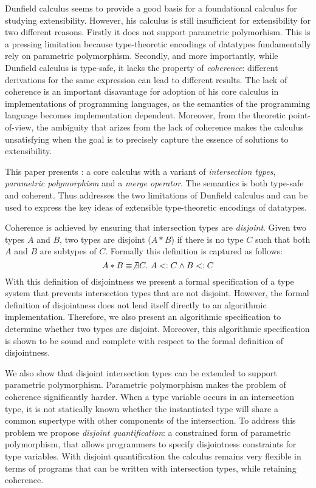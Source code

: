 
Dunfield calculus seems to provide a good basis for a foundational
calculus for studying extensibility.  However, his calculus is still
insufficient for extensibility for two different reasons.  Firstly it does not
support parametric polymorhism. This is a pressing limitation because
type-theoretic encodings of datatypes fundamentally rely on parametric
polymorphism.  Secondly, and more importantly, while Dunfield calculus
is type-safe, it lacks the property of \emph{coherence}: different
derivations for the same expression can lead to different results. The
lack of coherence is an important disavantage for adoption of his core
calculus in implementations of programming languages, as the semantics
of the programming language becomes implementation dependent.
Moreover, from the theoretic point-of-view, the ambiguity that arizes
from the lack of coherence makes the calculus unsatisfying when the
goal is to precisely capture the essence of solutions to
extensibility.

This paper presents \name: a core calculus with a variant of
\emph{intersection types}, \emph{parametric polymorphism} and a
\emph{merge operator}. The semantics \name is both type-safe and
coherent. Thus \name addresses the two limitations of Dunfield
calculus and can be used to express the key ideas of extensible
type-theoretic encodings of datatypes.

Coherence is achieved by ensuring that intersection types are
\emph{disjoint}. Given two types $A$ and $B$, two types are disjoint
($A * B$) if there is no type $C$ such that both $A$ and $B$ are
subtypes of $C$. Formally this definition is captured as follows:
\[A * B \equiv \not\exists C.~A <: C \wedge B <: C\]
With this definition of disjointness we present a formal specification
of a type system that prevents intersection types that are not
disjoint.  However, the formal definition of disjointness does
not lend itself directly to an algorithmic implementation. Therefore,
we also present an algorithmic specification to determine whether two
types are disjoint. Moreover, this algorithmic specification is shown to be
sound and complete with respect to the formal definition of
disjointness.

We also show that disjoint intersection types can be extended to
support parametric polymorphism. Parametric polymorphism makes the
problem of coherence significantly harder. When a type variable occurs
in an intersection type, it is not statically known whether the
instantiated type will share a common supertype with other components
of the intersection. To address this problem we propose
\emph{disjoint quantification}: a constrained form of parametric
polymorphism, that allows programmers to specify disjointness
constraints for type variables. With disjoint quantification the
calculus remains very flexible in terms of programs that can be
written with intersection types, while retaining coherence.


